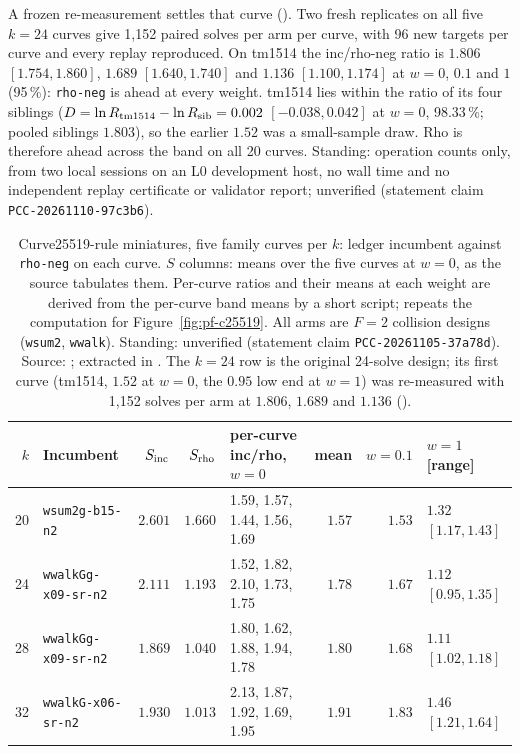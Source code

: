 A frozen re-measurement settles that curve
(). Two fresh replicates
on all five $k=24$ curves give 1{,}152 paired solves per arm per curve,
with 96 new targets per curve and every replay reproduced. On tm1514 the
inc/rho-neg ratio is $1.806$ $[1.754,1.860]$, $1.689$ $[1.640,1.740]$ and
$1.136$ $[1.100,1.174]$ at $w=0$, $0.1$ and $1$ (95\,\%): \texttt{rho-neg} is
ahead at every weight. tm1514 lies within the ratio of its four siblings
($D=\ln R_{\rm tm1514}-\ln R_{\rm sib}=0.002$ $[-0.038,0.042]$ at $w=0$,
98.33\,\%; pooled siblings $1.803$), so the earlier $1.52$ was a
small-sample draw. Rho is therefore ahead across the band on all 20 curves.
Standing: operation counts only, from two local sessions on an L0
development host, no wall time and no independent replay certificate or
validator report; unverified (statement claim \texttt{PCC-20261110-97c3b6}).

\begin{table}[t]
\centering\small
\setlength{\tabcolsep}{4pt}
\begin{tabular}{@{}rlrrlrrl@{}}
\toprule
$k$ & Incumbent & $S_{\rm inc}$ & $S_{\rm rho}$ & per-curve inc/rho, $w=0$ & mean & $w=0.1$ & $w=1$ [range] \\
\midrule
20 & \texttt{wsum2g-b15-n2} & $2.601$ & $1.660$ & 1.59, 1.57, 1.44, 1.56, 1.69 & $1.57$ & $1.53$ & $1.32$ $[1.17,1.43]$ \\
24 & \texttt{wwalkGg-x09-sr-n2} & $2.111$ & $1.193$ & 1.52, 1.82, 2.10, 1.73, 1.75 & $1.78$ & $1.67$ & $1.12$ $[0.95,1.35]$ \\
28 & \texttt{wwalkGg-x09-sr-n2} & $1.869$ & $1.040$ & 1.80, 1.62, 1.88, 1.94, 1.78 & $1.80$ & $1.68$ & $1.11$ $[1.02,1.18]$ \\
32 & \texttt{wwalkG-x06-sr-n2} & $1.930$ & $1.013$ & 2.13, 1.87, 1.92, 1.69, 1.95 & $1.91$ & $1.83$ & $1.46$ $[1.21,1.64]$ \\
\bottomrule
\end{tabular}
\caption[]{Curve25519-rule miniatures, five family curves per $k$:
ledger incumbent against \texttt{rho-neg} on each curve. $S$ columns:
means over the five curves at $w=0$, as the source tabulates them.
Per-curve ratios and their means at each weight are derived from the
per-curve band means by a short script; 
repeats the computation for Figure~\ref{fig:pf-c25519}.
All arms are $F=2$ collision designs (\texttt{wsum2}, \texttt{wwalk}).
Standing: unverified (statement claim \texttt{PCC-20261105-37a78d}).
Source: ;
extracted in . The $k=24$ row is the
original 24-solve design; its first curve (tm1514, $1.52$ at $w=0$, the
$0.95$ low end at $w=1$) was re-measured with 1{,}152 solves per arm at
$1.806$, $1.689$ and $1.136$ ().}
\label{tab:pf-c25519-multi}
\end{table}

